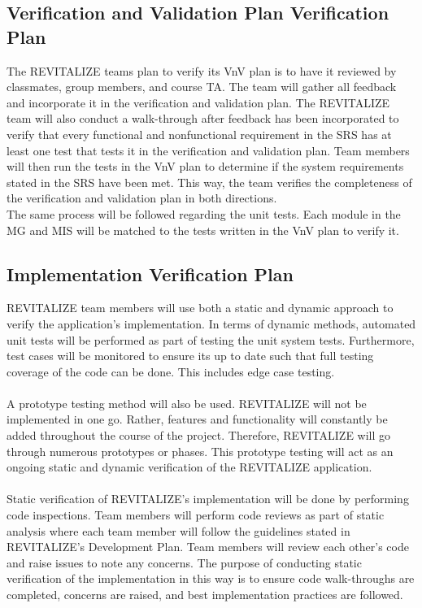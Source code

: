 \documentclass[12pt, titlepage]{article}
\begin{document}
\subsection{Verification and Validation Plan Verification Plan}

The REVITALIZE teams plan to verify its VnV plan is to have it reviewed by classmates, group members, and course TA. The team will gather all feedback and incorporate it in the verification and validation plan. The REVITALIZE team will also conduct a walk-through after feedback has been incorporated to verify that every functional and nonfunctional requirement in the SRS has at least one test that tests it in the verification and validation plan. Team members will then run the tests in the VnV plan to determine if the system requirements stated in the SRS have been met. This way, the team verifies the completeness of the verification and validation plan in both directions.\\
The same process will be followed regarding the unit tests. Each module in the MG and MIS will be matched to the tests written in the VnV plan to verify it.

\subsection{Implementation Verification Plan}

REVITALIZE team members will use both a static and dynamic approach to verify the application's implementation. In terms of dynamic methods, automated unit tests will be performed as part of testing the unit system tests. Furthermore, test cases will be monitored to ensure its up to date such that full testing coverage of the code can be done. This includes edge case testing.\\\\
A prototype testing method will also be used. REVITALIZE will not be implemented in one go. Rather, features and functionality will constantly be added throughout the course of the project. Therefore, REVITALIZE will go through numerous prototypes or phases. This prototype testing will act as an ongoing static and dynamic verification of the REVITALIZE application.\\\\
Static verification of REVITALIZE's implementation will be done by performing code inspections. Team members will perform code reviews as part of static analysis where each team member will follow the guidelines stated in REVITALIZE's Development Plan. Team members will review each other's code and raise issues to note any concerns. The purpose of conducting static verification of the implementation in this way is to ensure code walk-throughs are completed, concerns are raised, and best implementation practices are followed.
\end{document}
